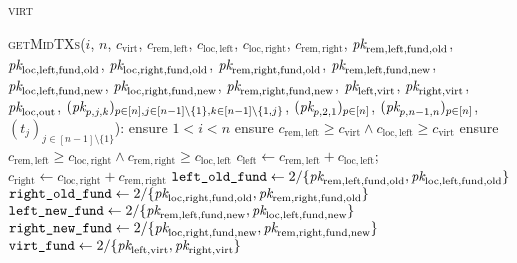 \begin{center}
  \begin{processbox}{\textsc{virt}}
    \begin{algorithmic}[1]
      \State {}
      \State \textsc{getMidTXs}($i$, $n$, $c_{\mathrm{virt}}$, $c_{\mathrm{rem},
      \mathrm{left}}$, $c_{\mathrm{loc}, \mathrm{left}}$, $c_{\mathrm{loc},
      \mathrm{right}}$, $c_{\mathrm{rem}, \mathrm{right}}$, $\textit{pk}_{\mathrm{rem},
      \mathrm{left}, \mathrm{fund}, \mathrm{old}}$, $\textit{pk}_{\mathrm{loc},
      \mathrm{left}, \mathrm{fund}, \mathrm{old}}$, $\textit{pk}_{\mathrm{loc},
      \mathrm{right}, \mathrm{fund}, \mathrm{old}}$, $\textit{pk}_{\mathrm{rem},
      \mathrm{right}, \mathrm{fund}, \mathrm{old}}$, $\textit{pk}_{\mathrm{rem},
      \mathrm{left}, \mathrm{fund}, \mathrm{new}}$, $\textit{pk}_{\mathrm{loc},
      \mathrm{left}, \mathrm{fund}, \mathrm{new}}$, $\textit{pk}_{\mathrm{loc},
      \mathrm{right}, \mathrm{fund}, \mathrm{new}}$, $\textit{pk}_{\mathrm{rem},
      \mathrm{right}, \mathrm{fund}, \mathrm{new}}$, $\textit{pk}_{\mathrm{left},
      \mathrm{virt}}$, $\textit{pk}_{\mathrm{right}, \mathrm{virt}}$, $\textit{pk}_{\mathrm{loc},
      \mathrm{out}}$, $(\textit{pk}_{p,j,k})_{p \in [n], j \in [n-1] \setminus \{1\}, k
      \in [n-1] \setminus \{1, j\}}$, $(\textit{pk}_{p, 2, 1})_{p \in [n]}$, $(\textit{pk}_{p,
      n-1, n})_{p \in [n]}$, $(t_j)_{j \in [n-1] \setminus \{1\}}$):
      \Indent
        \State ensure $1 < i < n$
        \State ensure $c_{\mathrm{rem}, \mathrm{left}} \geq c_{\mathrm{virt}}
        \wedge c_{\mathrm{loc}, \mathrm{left}} \geq c_{\mathrm{virt}}$
        \State ensure $c_{\mathrm{rem}, \mathrm{left}} \geq c_{\mathrm{loc},
        \mathrm{right}} \wedge c_{\mathrm{rem}, \mathrm{right}} \geq
        c_{\mathrm{loc}, \mathrm{left}}$ 
        \State $c_{\mathrm{left}} \gets c_{\mathrm{rem}, \mathrm{left}} +
        c_{\mathrm{loc}, \mathrm{left}}$; $c_{\mathrm{right}} \gets
        c_{\mathrm{loc}, \mathrm{right}} + c_{\mathrm{rem}, \mathrm{right}}$
        \State $\texttt{left\_old\_fund} \gets 2/\{\textit{pk}_{\mathrm{rem},
        \mathrm{left}, \mathrm{fund}, \mathrm{old}}, \textit{pk}_{\mathrm{loc},
        \mathrm{left}, \mathrm{fund}, \mathrm{old}}\}$
        \State $\texttt{right\_old\_fund} \gets 2/\{\textit{pk}_{\mathrm{loc},
        \mathrm{right}, \mathrm{fund}, \mathrm{old}}, \textit{pk}_{\mathrm{rem},
        \mathrm{right}, \mathrm{fund}, \mathrm{old}}\}$
        \State $\texttt{left\_new\_fund} \gets 2/\{\textit{pk}_{\mathrm{rem},
        \mathrm{left}, \mathrm{fund}, \mathrm{new}}, \textit{pk}_{\mathrm{loc},
        \mathrm{left}, \mathrm{fund}, \mathrm{new}}\}$
        \State $\texttt{right\_new\_fund} \gets 2/\{\textit{pk}_{\mathrm{loc},
        \mathrm{right}, \mathrm{fund}, \mathrm{new}}, \textit{pk}_{\mathrm{rem},
        \mathrm{right}, \mathrm{fund}, \mathrm{new}}\}$
        \State $\texttt{virt\_fund} \gets 2/\{\textit{pk}_{\mathrm{left}, \mathrm{virt}},
        \textit{pk}_{\mathrm{right}, \mathrm{virt}}\}$


\end{algorithmic}
\end{processbox}
\end{center}
